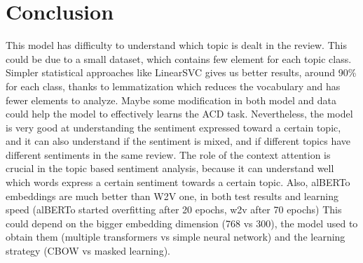 \documentclass{article}
\begin{document}
    \section{Conclusion}\label{sec:s6}
        This model has difficulty to understand which topic is dealt in the review.
        This could be due to a small dataset, which contains few element for each topic class.
        Simpler statistical approaches like LinearSVC gives us better results, around 90\% for each class, thanks to lemmatization which reduces the vocabulary and has fewer elements to analyze.
        Maybe some modification in both model and data could help the model to effectively learns the ACD task.
        Nevertheless, the model is very good at understanding the sentiment expressed toward a certain topic, and it can also understand
        if the sentiment is mixed, and if different topics have different sentiments in the same review.
        The role of the context attention is crucial in the topic based sentiment analysis, because it can understand well which words express a certain sentiment towards a certain topic.
        Also, alBERTo embeddings are much better than W2V one, in both test results and learning speed (alBERTo started overfitting after 20 epochs, w2v after 70 epochs)
        This could depend on the bigger embedding dimension (768 vs 300), the model used to obtain them
        (multiple transformers vs simple neural network) and the learning strategy (CBOW vs masked learning).
\end{document}

